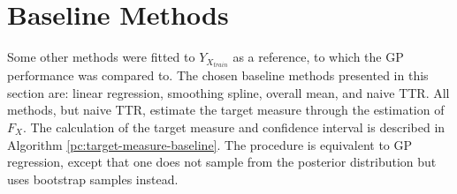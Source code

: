 \section{Baseline Methods}\label{sec:baseline-methods}

Some other methods were fitted to $Y_{X_{train}}$ as a reference, to which
the GP performance was compared to.
The chosen baseline methods presented in this section are: linear regression,
smoothing spline, overall mean, and naive TTR.
All methods, but naive TTR, estimate the target measure through the estimation of $F_X$.
The calculation of the target measure and confidence interval is described in
Algorithm \ref{pc:target-measure-baseline}.
The procedure is equivalent to GP regression, except that one does not sample from
the posterior distribution but uses bootstrap samples instead.


